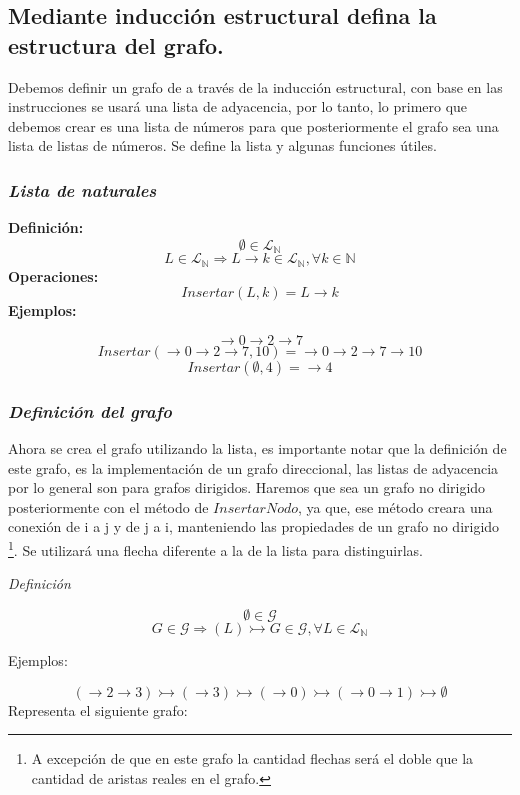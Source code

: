 \documentclass[../doc.tex]{subfiles}
\begin{document}
\subsection{Mediante inducción estructural defina la estructura del grafo.}

Debemos definir un grafo de a través de la inducción estructural, con base en 
las instrucciones se usará una lista de adyacencia, por lo tanto, lo primero que
debemos crear es una lista de números para que posteriormente el grafo sea una 
lista de listas de números. Se define la lista y algunas funciones útiles.

\subsubsection*{\emph{Lista de naturales}}
\textbf{Definición:}
\[ \emptyset \in \mathcal{L}_{\mathbb{N}} \]
\[ L \in \mathcal{L}_\mathbb{N} \Rightarrow L \rightarrow k \in \mathcal{L}_\mathbb{N}, \forall k \in \mathbb{N}\]
\textbf{Operaciones:}
\[ Insertar(L, k) = L \rightarrow k\]
\newline
\textbf{Ejemplos:}

\[ \rightarrow 0 \rightarrow 2 \rightarrow 7 \]
\[ Insertar(\rightarrow 0 \rightarrow 2 \rightarrow 7, 10) =  \rightarrow 0 \rightarrow 2 \rightarrow 7 \rightarrow 10\]
\[ Insertar(\emptyset, 4) = \rightarrow 4 \]

\subsubsection*{\emph{Definición del grafo}}
Ahora se crea el grafo utilizando la lista, es importante notar que la definición 
de este grafo, es la implementación de un grafo direccional, las listas 
de adyacencia por lo general son para grafos dirigidos. Haremos que sea un grafo
no dirigido posteriormente con el método de $InsertarNodo$, ya que, ese método creara 
una conexión de i a j y de j a i, manteniendo las propiedades de un grafo no dirigido
\footnote{A excepción de que en este grafo la cantidad flechas será el doble que la 
cantidad de aristas reales en el grafo.}. Se utilizará una flecha diferente a la 
de la lista para distinguirlas.

\emph{Definición}

\[ \emptyset \in \mathcal{G} \]
\[ G \in \mathcal{G} \Rightarrow (L) \rightarrowtail G \in \mathcal{G} , \forall L \in \mathcal{L}_\mathbb{N} \]

Ejemplos:

\[ ( \rightarrow 2 \rightarrow 3) \rightarrowtail (\rightarrow 3) \rightarrowtail (\rightarrow 0) \rightarrowtail (\rightarrow 0 \rightarrow 1) \rightarrowtail \emptyset \]
Representa el siguiente grafo: 
\end{document}
